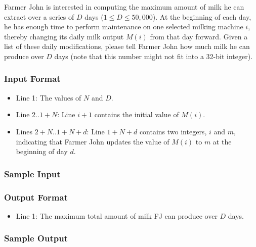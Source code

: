 Farmer John is interested in computing the maximum amount of milk he can
extract over a series of $D$ days ($1 \leq D \leq 50,000$).
At the beginning of each day, he has enough time to perform maintenance on one selected milking machine $i$, thereby changing its daily milk output $M(i)$ from that day forward.
Given a list of these daily modifications, please tell Farmer John how much milk he can produce over $D$ days (note that this number might not fit into a 32-bit integer).

\subsubsection{Input Format}

\begin{itemize}
    \item Line 1: The values of $N$ and $D$.
    \item Line 2..$1+N$: Line $i+1$ contains the initial value of $M(i)$.
    \item Lines $2+N$..$1+N+d$: Line $1+N+d$ contains two integers, $i$ and $m$, indicating that Farmer John updates the value of $M(i)$ to $m$ at the beginning of day $d$.
\end{itemize}

\subsubsection{Sample Input}


\subsubsection{Output Format}

\begin{itemize}
    \item Line 1: The maximum total amount of milk FJ can produce over $D$ days.
\end{itemize}

\subsubsection{Sample Output}


